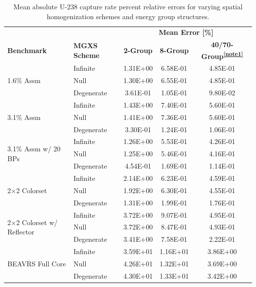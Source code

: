\begin{table}[h!]
  \centering
  \caption[Mean OpenMOC U-238 capture rate errors]{Mean absolute U-238 capture rate percent relative errors for varying spatial homogenization schemes and energy group structures.}
  \small
  \label{table:chap8-openmoc-mean-capt-rates}
  \vspace{6pt}
  \begin{tabular}{l l c c c}
  \toprule
  \rowcolor{lightgray}
  & & \multicolumn{3}{c}{\cellcolor{lightgray} \textbf{Mean Error [\%]}} \\
  \multirow{-2}{*}{\cellcolor{lightgray} \bf Benchmark} &
  \multirow{-2}{*}{\cellcolor{lightgray} \bf \ac{MGXS} Scheme} &
  \multicolumn{1}{c}{{\cellcolor{lightgray} \bf 2-Group}} &
  \multicolumn{1}{c}{{\cellcolor{lightgray} \bf 8-Group}} &
  \multicolumn{1}{c}{{\cellcolor{lightgray} \bf 40/70-Group\textsuperscript{\ref{note1}}}} \\
  \midrule
\multirow{3}{*}{\parbox{2.5cm}{1.6\% Assm}} & Infinite & 1.31E+00 & 6.58E-01 & 4.85E-01 \\
& Null & 1.30E+00 & 6.55E-01 & 4.85E-01 \\
& Degenerate & 3.61E-01 & 1.05E-01 & 9.80E-02 \\
  \midrule
\multirow{3}{*}{\parbox{2.5cm}{3.1\% Assm}} & Infinite & 1.43E+00 & 7.40E-01 & 5.60E-01 \\
& Null & 1.41E+00 & 7.36E-01 & 5.60E-01 \\
& Degenerate & 3.30E-01 & 1.24E-01 & 1.06E-01 \\
  \midrule
\multirow{3}{*}{\parbox{2.5cm}{3.1\% Assm w/ 20 BPs}} & Infinite & 1.26E+00 & 5.53E-01 & 4.26E-01 \\
& Null & 1.25E+00 & 5.46E-01 & 4.16E-01 \\
& Degenerate & 4.54E-01 & 1.69E-01 & 1.14E-01 \\
  \midrule
\multirow{3}{*}{\parbox{2.5cm}{2$\times$2 Colorset}} & Infinite & 2.14E+00 & 6.23E-01 & 4.59E-01 \\
& Null & 1.92E+00 & 6.30E-01 & 4.55E-01 \\
& Degenerate & 1.31E+00 & 1.99E-01 & 1.76E-01 \\
  \midrule
\multirow{3}{*}{\parbox{2.5cm}{2$\times$2 Colorset w/ Reflector}} & Infinite & 3.72E+00 & 9.07E-01 & 4.95E-01 \\
& Null & 3.72E+00 & 8.47E-01 & 4.93E-01 \\
& Degenerate & 3.41E+00 & 7.58E-01 & 2.22E-01 \\
  \midrule
\multirow{3}{*}{\parbox{2.5cm}{BEAVRS Full Core}} & Infinite & 3.59E+01 & 1.16E+01 & 3.86E+00 \\
& Null & 4.26E+01 & 1.32E+01 & 3.69E+00 \\
& Degenerate & 4.30E+01 & 1.33E+01 & 3.42E+00 \\
  \bottomrule
\end{tabular}
\end{table}

